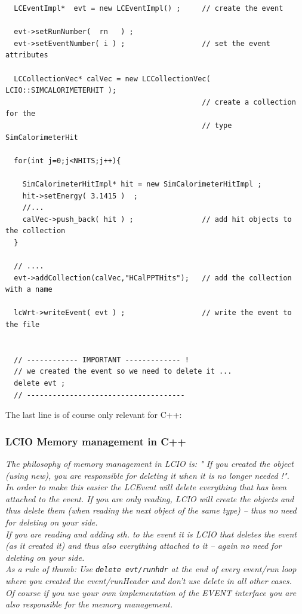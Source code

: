 \documentclass[twoside]{article}
\begin{document}
\begin{verbatim}
  LCEventImpl*  evt = new LCEventImpl() ;     // create the event 

  evt->setRunNumber(  rn   ) ;
  evt->setEventNumber( i ) ;                  // set the event attributes

  LCCollectionVec* calVec = new LCCollectionVec( LCIO::SIMCALORIMETERHIT );   
                                              // create a collection for the 
                                              // type SimCalorimeterHit

  for(int j=0;j<NHITS;j++){
  
    SimCalorimeterHitImpl* hit = new SimCalorimeterHitImpl ;
    hit->setEnergy( 3.1415 )  ;
    //...  
    calVec->push_back( hit ) ;                // add hit objects to the collection
  }

  // ....
  evt->addCollection(calVec,"HCalPPTHits");   // add the collection with a name

  lcWrt->writeEvent( evt ) ;                  // write the event to the file


  // ------------ IMPORTANT ------------- ! 
  // we created the event so we need to delete it ...
  delete evt ;
  // -------------------------------------
\end{verbatim}

The last line is of course only relevant for C++:

\subsubsection{ LCIO Memory management in C++} \label{cppmem}
{\em The philosophy of memory management in LCIO is: " If you created the object (using new),
you are responsible for deleting it when it is no longer needed !".\\
In order to make this easier the LCEvent will delete everything that has been attached to the event.
If you are only reading, LCIO will create the objects and thus delete them (when reading the next 
object of the same type) -- thus no need for deleting on your side.\\
If you are reading and adding sth. to the event it is  LCIO that deletes the event 
(as it created it) and thus also everything attached to it -- again no need for deleting on your 
side.\\
As a rule of thumb: Use \verb$delete evt/runhdr$ at the end of every event/run loop where you 
created the event/runHeader and don't use delete in all other cases.\\
Of course if you use your own implementation of the EVENT interface you are also responsible for the 
memory management.}
 
\end{document}

